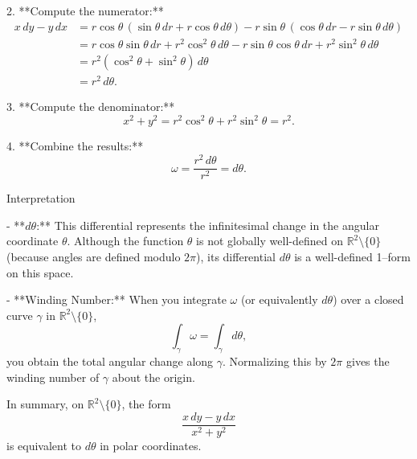\documentclass[11pt,openany]{article}
\begin{document}
2. **Compute the numerator:**
\[
\begin{aligned}
	x\,dy - y\,dx &= r\cos\theta \,(\sin\theta\,dr + r\cos\theta\,d\theta) - r\sin\theta\,(\cos\theta\,dr - r\sin\theta\,d\theta) \\
	&= r\cos\theta\sin\theta\,dr + r^2\cos^2\theta\,d\theta - r\sin\theta\cos\theta\,dr + r^2\sin^2\theta\,d\theta \\
	&= r^2 (\cos^2\theta + \sin^2\theta)\,d\theta \\
	&= r^2\,d\theta.
\end{aligned}
\]

3. **Compute the denominator:**
\[
x^2+y^2 = r^2\cos^2\theta + r^2\sin^2\theta = r^2.
\]

4. **Combine the results:**
\[
\omega = \frac{r^2\,d\theta}{r^2} = d\theta.
\]

 Interpretation

- **\(d\theta\):**  
This differential represents the infinitesimal change in the angular coordinate \(\theta\). Although the function \(\theta\) is not globally well-defined on \(\mathbb{R}^2 \setminus \{0\}\) (because angles are defined modulo \(2\pi\)), its differential \(d\theta\) is a well-defined 1–form on this space.

- **Winding Number:**  
When you integrate \(\omega\) (or equivalently \(d\theta\)) over a closed curve \(\gamma\) in \(\mathbb{R}^2 \setminus \{0\}\),
\[
\int_\gamma \omega = \int_\gamma d\theta,
\]
you obtain the total angular change along \(\gamma\). Normalizing this by \(2\pi\) gives the winding number of \(\gamma\) about the origin.

In summary, on \(\mathbb{R}^2 \setminus \{0\}\), the form
\[
\frac{x\,dy - y\,dx}{x^2+y^2}
\]
is equivalent to \(d\theta\) in polar coordinates.
\end{document}
